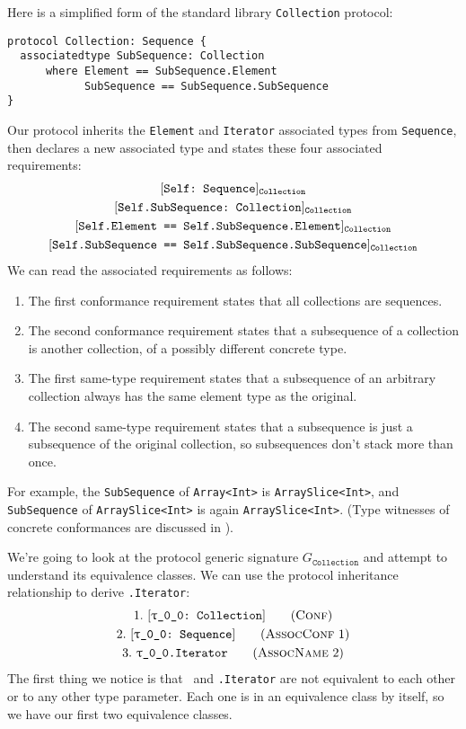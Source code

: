 \documentclass[../generics]{subfiles}
\begin{document}
\begin{example}\label{protocol collection example}
Here is a simplified form of the standard library \texttt{Collection} protocol:
\begin{Verbatim}
protocol Collection: Sequence {
  associatedtype SubSequence: Collection
      where Element == SubSequence.Element
            SubSequence == SubSequence.SubSequence
}
\end{Verbatim}
Our protocol inherits the \texttt{Element} and \texttt{Iterator} associated types from \texttt{Sequence}, then declares a new associated type and states these four associated requirements:
\begin{gather*}
\ConfReq{Self}{Sequence}_\texttt{Collection}\\
\ConfReq{Self.SubSequence}{Collection}_\texttt{Collection}\\
\SameReq{Self.Element}{Self.SubSequence.Element}_\texttt{Collection}\\
\SameReq{Self.SubSequence}{Self.SubSequence.SubSequence}_\texttt{Collection}
\end{gather*}
We can read the associated requirements as follows:
\begin{enumerate}
\item The first conformance requirement states that all collections are sequences.
\item The second conformance requirement states that a subsequence of a collection is another collection, of a possibly different concrete type.
\item The first same-type requirement states that a subsequence of an arbitrary collection always has the same element type as the original.
\item The second same-type requirement states that a subsequence is just a subsequence of the original collection, so subsequences don't stack more than once.
\end{enumerate}
For example, the \texttt{SubSequence} of \texttt{Array<Int>} is \texttt{ArraySlice<Int>}, and \texttt{SubSequence} of \texttt{ArraySlice<Int>} is again \texttt{ArraySlice<Int>}. (Type witnesses of concrete conformances are discussed in ).

We're going to look at the protocol generic signature $G_\texttt{Collection}$ and attempt to understand its equivalence classes. We can use the protocol inheritance relationship to derive \texttt{\rT.Iterator}:
\begin{gather*}
\ConfStep{\rT}{Collection}{1}\\
\AssocConfStep{1}{\rT}{Sequence}{2}\\
\AssocNameStep{2}{\rT.Iterator}{3}
\end{gather*}
The first thing we notice is that \rT\ and \texttt{\rT.Iterator} are not equivalent to each other or to any other type parameter. Each one is in an equivalence class by itself, so we have our first two equivalence classes.


\end{example}
\end{document}
